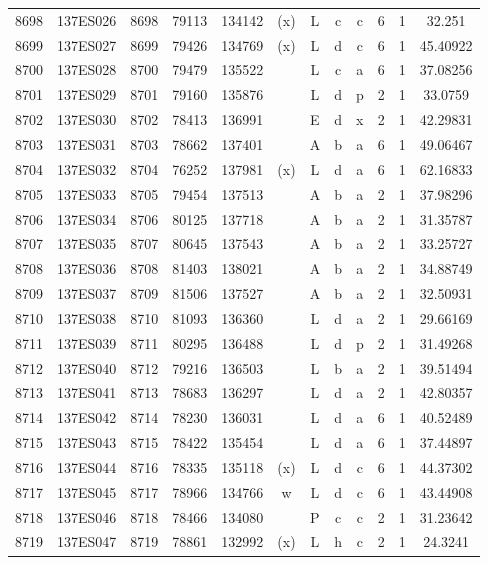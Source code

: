 \begin{tabular}{|*{12}{c|}}
8698 & 137ES026 & 8698 & 79113 & 134142 & (x) & L & c & c & 6 & 1 & 32.251 \\ 
8699 & 137ES027 & 8699 & 79426 & 134769 & (x) & L & d & c & 6 & 1 & 45.40922 \\ 
8700 & 137ES028 & 8700 & 79479 & 135522 &  & L & c & a & 6 & 1 & 37.08256 \\ 
8701 & 137ES029 & 8701 & 79160 & 135876 &  & L & d & p & 2 & 1 & 33.0759 \\ 
8702 & 137ES030 & 8702 & 78413 & 136991 &  & E & d & x & 2 & 1 & 42.29831 \\ 
8703 & 137ES031 & 8703 & 78662 & 137401 &  & A & b & a & 6 & 1 & 49.06467 \\ 
8704 & 137ES032 & 8704 & 76252 & 137981 & (x) & L & d & a & 6 & 1 & 62.16833 \\ 
8705 & 137ES033 & 8705 & 79454 & 137513 &  & A & b & a & 2 & 1 & 37.98296 \\ 
8706 & 137ES034 & 8706 & 80125 & 137718 &  & A & b & a & 2 & 1 & 31.35787 \\ 
8707 & 137ES035 & 8707 & 80645 & 137543 &  & A & b & a & 2 & 1 & 33.25727 \\ 
8708 & 137ES036 & 8708 & 81403 & 138021 &  & A & b & a & 2 & 1 & 34.88749 \\ 
8709 & 137ES037 & 8709 & 81506 & 137527 &  & A & b & a & 2 & 1 & 32.50931 \\ 
8710 & 137ES038 & 8710 & 81093 & 136360 &  & L & d & a & 2 & 1 & 29.66169 \\ 
8711 & 137ES039 & 8711 & 80295 & 136488 &  & L & d & p & 2 & 1 & 31.49268 \\ 
8712 & 137ES040 & 8712 & 79216 & 136503 &  & L & b & a & 2 & 1 & 39.51494 \\ 
8713 & 137ES041 & 8713 & 78683 & 136297 &  & L & d & a & 2 & 1 & 42.80357 \\ 
8714 & 137ES042 & 8714 & 78230 & 136031 &  & L & d & a & 6 & 1 & 40.52489 \\ 
8715 & 137ES043 & 8715 & 78422 & 135454 &  & L & d & a & 6 & 1 & 37.44897 \\ 
8716 & 137ES044 & 8716 & 78335 & 135118 & (x) & L & d & c & 6 & 1 & 44.37302 \\ 
8717 & 137ES045 & 8717 & 78966 & 134766 & w & L & d & c & 6 & 1 & 43.44908 \\ 
8718 & 137ES046 & 8718 & 78466 & 134080 &  & P & c & c & 2 & 1 & 31.23642 \\ 
8719 & 137ES047 & 8719 & 78861 & 132992 & (x) & L & h & c & 2 & 1 & 24.3241 \\ 

\end{tabular}
